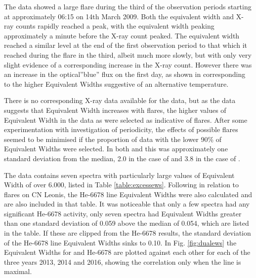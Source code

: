 The {\uves} data showed a large flare during the third of the observation periods starting at approximately 06:15 on
14th March 2009. Both the equivalent width and X-ray counts rapidly reached a peak, with the equivalent width peaking
approximately a minute before the X-ray count peaked. The equivalent width reached a similar level at the end of the
first observation period to that which it reached during the flare in the third, albeit much more slowly, but with only
very slight evidence of a corresponding increase in the X-ray count. However there was an increase in the {\uves}
optical''blue'' flux on the first day, as shown in \citet[fig. 1]{fuhrmeister11} corresponding to the higher Equivalent
Widths suggestive of an alternative temperature.

There is no corresponding X-ray data available for the {\harps} data, but as the {\uves} data suggests that {\ha}
Equivalent Width increases with flares, the higher values of Equivalent Width in the {\harps} data as were selected as
indicative of flares. After some experimentation with investigation of periodicity, the effects of possible flares seemed to be
minimised if the proportion of data with the lower 90\% of Equivalent Widths were selected. In both {\uves} and {\harps}
this was approximately one standard deviation from the median, 2.0 in the case of {\uves} and 3.8 in the case of
{\harps}.

The {\harps} data contains seven spectra with particularly large values of Equivalent Width of over 6.000, listed in
Table \ref{table:excessews}.  Following \citet[fig. 8]{fuhrmeister08} in relation to flares on CN Leonis, the He-6678
line Equivalent Widths were also calculated and are also included in that table. It was noticeable that only a few
spectra had any significant He-6678 activity, only seven spectra had Equivalent Widths greater than one standard
deviation of 0.059 above the median of 0.054, which are listed in the table. If these are clipped from the He-6678
results, the standard deviation of the He-6678 line Equivalent Widths sinks to 0.10. In Fig. \ref{fig:dualews} the
Equivalent Widths for {\ha} and He-6678 are plotted against each other for each of the three years 2013, 2014 and
2016, showing the correlation only when the {\ha} line is maximal.

